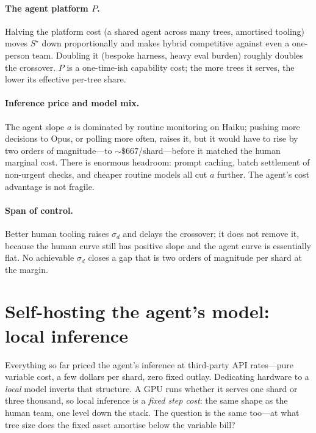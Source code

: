 \documentclass[11pt]{article}
\newcommand{\shards}{S}
\newcommand{\agentcost}{a}
\begin{document}
\paragraph{The agent platform $P$.} Halving the platform cost (a shared agent across many trees,
amortised tooling) moves $\shards^\star$ down proportionally and makes hybrid competitive against
even a one-person team. Doubling it (bespoke harness, heavy eval burden) roughly doubles the
crossover. $P$ is a one-time-ish capability cost; the more trees it serves, the lower its effective
per-tree share.

\paragraph{Inference price and model mix.} The agent slope $\agentcost$ is dominated by routine
monitoring on Haiku; pushing more decisions to Opus, or polling more often, raises it, but it would
have to rise by two orders of magnitude---to $\sim\!\$\num{667}$/shard---before it matched the human
marginal cost. There is enormous headroom: prompt caching, batch settlement of non-urgent checks,
and cheaper routine models all cut $\agentcost$ further. The agent's cost advantage is not fragile.

\paragraph{Span of control.} Better human tooling raises $\sigma_d$ and delays the crossover; it does
not remove it, because the human curve still has positive slope and the agent curve is essentially
flat. No achievable $\sigma_d$ closes a gap that is two orders of magnitude per shard at the margin.

\section{Self-hosting the agent's model: local inference}
\label{sec:local}

Everything so far priced the agent's inference at third-party API rates---pure variable cost, a few
dollars per shard, zero fixed outlay. Dedicating hardware to a \emph{local} model inverts that
structure. A GPU runs whether it serves one shard or three thousand, so local inference is a
\emph{fixed step cost}: the same shape as the human team, one level down the stack. The question is
the same too---at what tree size does the fixed asset amortise below the variable bill?
\end{document}
